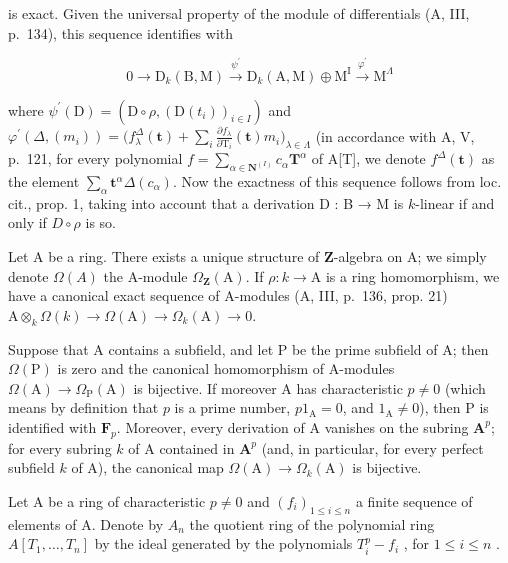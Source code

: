 is exact. Given the universal property of the module of differentials (A, III, p.~134), this sequence identifies with

\[
0 \to \mathrm{D} _ {k} (\mathrm{B}, \mathrm{M}) \xrightarrow {\psi^ {\prime}} \mathrm{D} _ {k} (\mathrm{A}, \mathrm{M}) \oplus \mathrm{M} ^ {\mathrm{I}} \xrightarrow {\varphi^ {\prime}} \mathrm{M} ^ {\Lambda}
\]

where \(\psi^{\prime}(\mathrm{D}) = (\mathrm{D}\circ \rho,(\mathrm{D}(t_{i}))_{i\in I})\) and \(\varphi^{\prime}(\Delta,(m_{i})) = \big(f_{\lambda}^{\Delta}(\mathbf{t}) + \sum_{i}\frac{\partial f_{\lambda}}{\partial\mathrm{T}_{i}}(\mathbf{t})m_{i}\big)_{\lambda \in \Lambda}\) (in accordance with A, V, p.~121, for every polynomial \(f = \sum_{\alpha \in \mathbf{N}^{(I)}}c_{\alpha}\mathbf{T}^{\alpha}\) of A{[}T{]}, we denote \(f^{\Delta}(\mathbf{t})\) as the element \(\sum_{\alpha}\mathbf{t}^{\alpha}\Delta(c_{\alpha})\). Now the exactness of this sequence follows from loc. cit., prop. 1, taking into account that a derivation D : B → M is \(k\)-linear if and only if \(D\circ\rho\) is so.

Let A be a ring. There exists a unique structure of \(\mathbf{Z}\)-algebra on A; we simply denote \(\Omega(A)\) the A-module \(\Omega_{\mathbf{Z}}(\mathrm{A})\). If \(\rho : k \to \mathrm{A}\) is a ring homomorphism, we have a canonical exact sequence of A-modules (A, III, p.~136, prop. 21) \(\mathrm{A} \otimes_k \Omega(k) \to \Omega(\mathrm{A}) \to \Omega_k(\mathrm{A}) \to 0\).

Suppose that A contains a subfield, and let P be the prime subfield of A; then \(\Omega(\mathrm{P})\) is zero and the canonical homomorphism of A-modules \(\Omega(\mathrm{A}) \to \Omega_{\mathrm{P}}(\mathrm{A})\) is bijective. If moreover A has characteristic \(p \neq 0\) (which means by definition that \(p\) is a prime number, \(p1_{\mathrm{A}} = 0\), and \(1_{\mathrm{A}} \neq 0\)), then P is identified with \(\mathbf{F}_p\). Moreover, every derivation of A vanishes on the subring \(\mathbf{A}^p\); for every subring \(k\) of A contained in \(\mathbf{A}^p\) (and, in particular, for every perfect subfield \(k\) of A), the canonical map \(\Omega(\mathrm{A}) \to \Omega_k(\mathrm{A})\) is bijective.

Let A be a ring of characteristic \(p \neq 0\) and \((f_i)_{1 \leqslant i \leqslant n}\) a finite sequence of elements of A. Denote by \(A_n\) the quotient ring of the polynomial ring \(A[T_1, \ldots, T_n]\) by the ideal generated by the polynomials \(T_i^p - f_i\) , for \(1 \leqslant i \leqslant n\) .

